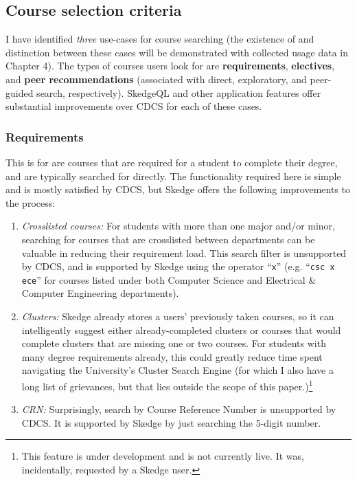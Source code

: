 \subsection{Course selection criteria}

I have identified \emph{three} use-cases for course searching (the existence of and distinction between these cases will be demonstrated with collected usage data in Chapter 4). The types of courses users look for are \textbf{requirements}, \textbf{electives}, and \textbf{peer recommendations} (associated with direct, exploratory, and peer-guided search, respectively). SkedgeQL and other application features offer substantial improvements over CDCS for each of these cases. 

  \subsubsection{Requirements}

  This is for are courses that are required for a student to complete their degree, and are typically searched for directly. The functionality required here is simple and is mostly satisfied by CDCS, but Skedge offers the following improvements to the process:

  \begin{enumerate}
    \item \emph{Crosslisted courses:} For students with more than one major and/or minor, searching for courses that are crosslisted between departments can be valuable in reducing their requirement load. This search filter is unsupported by CDCS, and is supported by Skedge using the operator ``{\tt x}'' (e.g. ``{\tt csc x ece}'' for courses listed under both Computer Science and Electrical \& Computer Engineering departments).

    \item \emph{Clusters:} Skedge already stores a users' previously taken courses, so it can intelligently suggest either already-completed clusters or courses that would complete clusters that are missing one or two courses. For students with many degree requirements already, this could greatly reduce time spent navigating the University's Cluster Search Engine (for which I also have a long list of grievances, but that lies outside the scope of this paper.)\footnote{This feature is under development and is not currently live. It was, incidentally, requested by a Skedge user.}

    \item \emph{CRN:} Surprisingly, search by Course Reference Number is unsupported by CDCS. It is supported by Skedge by just searching the 5-digit number.
  \end{enumerate}


